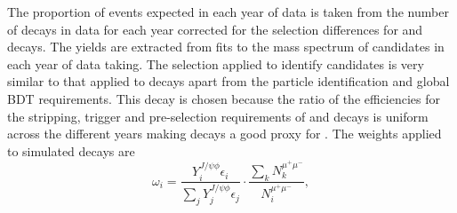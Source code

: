 The proportion of events expected in each year of data is taken from the number of \bsjpsiphi decays in data for each year corrected for the selection differences for \bsmumu and \bsjpsiphi decays. The \bsjpsiphi yields are extracted from fits to the mass spectrum of candidates in each year of data taking. The selection applied to identify \bsjpsiphi candidates is very similar to that applied to \bsmumu decays apart from the particle identification and global BDT requirements. This decay is chosen because the ratio of the efficiencies for the stripping, trigger and pre-selection requirements of \bsmumu and \bsjpsiphi decays is uniform across the different years making \bsjpsiphi decays a good proxy for \bsmumu. 
The weights applied to simulated \bsmumu decays are
\begin{equation}
\omega_{i}  = \frac{Y_{i}^{J/\psi \phi} \epsilon_{i}}{\displaystyle\sum_{j} Y_{j}^{J/\psi \phi} \epsilon_{j}} \cdot \frac{\displaystyle\sum_{k} N_{k}^{\mu^{+}\mu^{-}}}{N_{i}^{\mu^{+}\mu^{-}}},
\end{equation}

